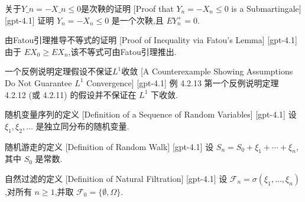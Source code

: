\documentclass[UTF8]{ctexart}
\begin{document}
    
    
    \begin{prf}
        [Proof-that-$Y-n-=---X-n-\leq-0$-is-a-Submartingale]
        {关于$Y\_n = - X\_n \leq 0$是次鞅的证明}
        [Proof that $Y_n = - X_n \leq 0$ is a Submartingale]
        [gpt-4.1]
        证明 $Y_n = - X_n \leq 0$ 是一个次鞅,且 $E Y_n^+ = 0$.
    \end{prf}
    
    
    
    \begin{prf}
        {由Fatou引理推导不等式的证明}
        [Proof of Inequality via Fatou's Lemma]
        [gpt-4.1]
        由于 $E X_0 \geq E X_n$,该不等式可由Fatou引理推出.
    \end{prf}
    
    
    
    \begin{xmp}
        {一个反例说明定理假设不保证$L^1$收敛}
        [A Counterexample Showing Assumptions Do Not Guarantee $L^1$ Convergence]
        [gpt-4.1]
        例 4.2.13 第一个反例说明定理 4.2.12 (或 4.2.11) 的假设并不保证在 $L^1$ 下收敛.
    \end{xmp}
    
    
    
    \begin{dfn}
        {随机变量序列的定义}
        [Definition of a Sequence of Random Variables]
        [gpt-4.1]
        设 $\xi_{1}, \xi_{2}, \ldots$ 是独立同分布的随机变量.
    \end{dfn}
    
    
    
    \begin{dfn}
        {随机游走的定义}
        [Definition of Random Walk]
        [gpt-4.1]
        设 $S_{n} = S_{0} + \xi_{1} + \cdots + \xi_{n}$,其中 $S_{0}$ 是常数.
    \end{dfn}
    
    
    
    \begin{dfn}
        {自然过滤的定义}
        [Definition of Natural Filtration]
        [gpt-4.1]
        设 $\mathcal{F}_{n} = \sigma(\xi_{1}, \ldots, \xi_{n})$,对所有 $n \geq 1$,并取 ${\mathcal{F}}_{0} = \{\emptyset, \Omega\}$.
    \end{dfn}
    
\end{document}
